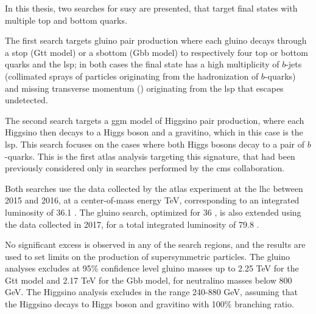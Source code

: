 In this thesis, two searches for \gls{susy} are presented, 
that target final states with multiple top and bottom quarks.

The first search targets gluino pair production where each gluino decays through a stop
(Gtt model) or a sbottom (Gbb model) 
to respectively four top or bottom quarks and the \gls{lsp};
in both cases the final state has a high multiplicity of $b$-jets (collimated 
sprays of particles originating from the hadronization of $b$-quarks) and 
missing transverse momentum (\met) originating from the \gls{lsp} 
that escapes undetected. 

The second search targets a \gls{ggm} model of Higgsino pair production, 
where each Higgsino then decays to a Higgs boson and 
a gravitino, which in this case is the \gls{lsp}. 
This search focuses on the cases where both Higgs bosons decay to a 
pair of $b$-quarks.
This is the first \gls{atlas} analysis targeting this signature, that had been 
previously considered only in searches performed by the \gls{cms} collaboration.

Both searches use the data collected by the \gls{atlas} experiment at the \gls{lhc} 
between 2015 and 2016, at a center-of-mass energy  \cmtre TeV,
corresponding to an integrated luminosity of 36.1 \ifb.
The gluino search, optimized for 36 \ifb, is also extended using the data collected in 2017, 
for a total integrated luminosity of 79.8 \ifb.

No significant excess is observed in any of the search regions, 
and the results are used to 
set limits on the production of supersymmetric particles. 
The gluino analyses excludes at 95\% confidence level gluino masses up to 2.25 TeV for the Gtt model 
and 2.17 TeV for the Gbb model, for neutralino masses below 800 GeV.
The Higgsino analysis excludes \mhino in the range 240-880 GeV, assuming 
that the Higgsino decays to Higgs boson and gravitino with 100\% branching ratio. 

